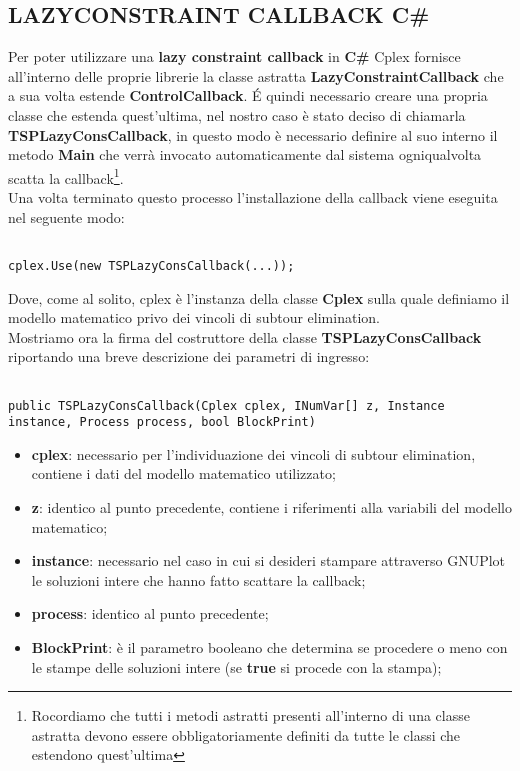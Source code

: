 \documentclass[11pt]{article}
\begin{document}
\subsection*{LAZYCONSTRAINT CALLBACK C\#}

Per poter utilizzare una \textbf{lazy constraint callback} in \textbf{C\#} Cplex fornisce all'interno delle proprie librerie la classe astratta \textbf{LazyConstraintCallback} che a sua volta estende \textbf{ControlCallback}. \'E quindi necessario creare una propria classe che estenda quest'ultima, nel nostro caso è stato deciso di chiamarla \textbf{TSPLazyConsCallback}, in questo modo è necessario definire al suo interno il metodo \textbf{Main} che verrà invocato automaticamente dal sistema ogniqualvolta scatta la callback\footnote{Rocordiamo che tutti i metodi astratti presenti all'interno di una classe astratta devono essere obbligatoriamente definiti da tutte le classi che estendono quest'ultima}.\\
Una volta terminato questo processo l'installazione della callback viene eseguita nel seguente modo:

\begin{lstlisting}

cplex.Use(new TSPLazyConsCallback(...));

\end{lstlisting}

Dove, come al solito, cplex è l'instanza della classe \textbf{Cplex} sulla quale definiamo il modello matematico privo dei vincoli di subtour elimination.\\
Mostriamo ora la firma del costruttore della classe \textbf{TSPLazyConsCallback} riportando una breve descrizione dei parametri di ingresso:

\begin{lstlisting}

public TSPLazyConsCallback(Cplex cplex, INumVar[] z, Instance instance, Process process, bool BlockPrint)

\end{lstlisting}

\begin{itemize}
    \item \textbf{cplex}: necessario per l'individuazione dei vincoli di subtour elimination, contiene i dati del modello matematico utilizzato;
    \item \textbf{z}: identico al punto precedente, contiene i riferimenti alla variabili del modello matematico;
    \item \textbf{instance}: necessario nel caso in cui si desideri stampare attraverso GNUPlot le soluzioni intere che hanno fatto scattare la callback;
    \item \textbf{process}: identico al punto precedente;
    \item \textbf{BlockPrint}: è il parametro booleano che determina se procedere o meno con le stampe delle soluzioni intere (se \textbf{true} si procede con la stampa);
\end{itemize}
\end{document}
